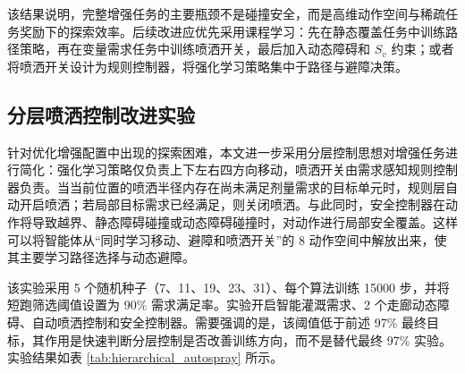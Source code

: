 \documentclass[UTF8]{ctexart}
\begin{document}
该结果说明，完整增强任务的主要瓶颈不是碰撞安全，而是高维动作空间与稀疏任务奖励下的探索效率。后续改进应优先采用课程学习：先在静态覆盖任务中训练路径策略，再在变量需求任务中训练喷洒开关，最后加入动态障碍和 $S_v$ 约束；或者将喷洒开关设计为规则控制器，将强化学习策略集中于路径与避障决策。

\subsection{分层喷洒控制改进实验}

针对优化增强配置中出现的探索困难，本文进一步采用分层控制思想对增强任务进行简化：强化学习策略仅负责上下左右四方向移动，喷洒开关由需求感知规则控制器负责。当当前位置的喷洒半径内存在尚未满足剂量需求的目标单元时，规则层自动开启喷洒；若局部目标需求已经满足，则关闭喷洒。与此同时，安全控制器在动作将导致越界、静态障碍碰撞或动态障碍碰撞时，对动作进行局部安全覆盖。这样可以将智能体从“同时学习移动、避障和喷洒开关”的 8 动作空间中解放出来，使其主要学习路径选择与动态避障。

该实验采用 5 个随机种子（7、11、19、23、31）、每个算法训练 15000 步，并将短跑筛选阈值设置为 90\% 需求满足率。实验开启智能灌溉需求、2 个走廊动态障碍、自动喷洒控制和安全控制器。需要强调的是，该阈值低于前述 97\% 最终目标，其作用是快速判断分层控制是否改善训练方向，而不是替代最终 97\% 实验。实验结果如表 \ref{tab:hierarchical_autospray} 所示。

\begin{table}[H]
\centering
\caption{分层喷洒控制增强实验结果（5 个随机种子，15000 步，90\% 需求目标）}
\label{tab:hierarchical_autospray}
\end{table}
\end{document}
